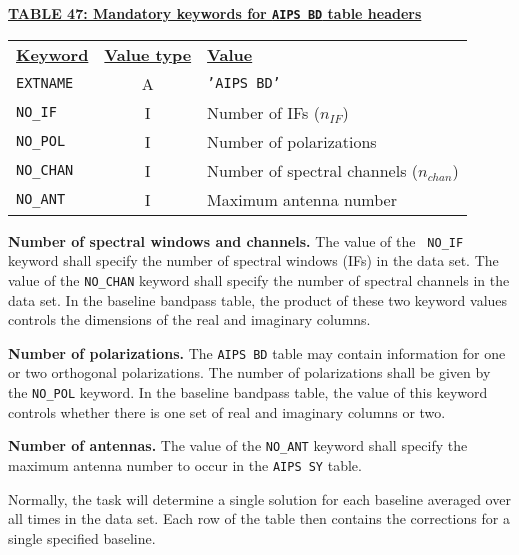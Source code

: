 \documentclass[twoside]{article}
\newcommand{\nif}{$n_{IF}$}
\newcommand{\nchan}{$n_{chan}$}
\begin{document}
\begin{center}
\underline{\bf{TABLE 47: Mandatory keywords for {\tt AIPS BD} table
    headers}}\\
\begin{tabular}{lcl}
\noalign{\vspace{2pt}} \label{ta:BDkeys}
\underline{{\bf Keyword}} & \underline{\bf{Value type}} &
    \underline{\bf{Value\vphantom{y}}} \\
\noalign{\vspace{2pt}}
{\tt EXTNAME}   & A & {\tt 'AIPS BD'}  \\
{\tt NO\_IF}    & I & Number of IFs (\nif)\\
{\tt NO\_POL}   & I & Number of polarizations \\
{\tt NO\_CHAN}  & I & Number of spectral channels (\nchan) \\
{\tt NO\_ANT}   & I & Maximum antenna number
\end{tabular}
\end{center}

{\bf Number of spectral windows and channels.} The value of the {\tt
  NO\_IF} keyword shall specify the number of spectral windows (IFs)
in the data set.  The value of the {\tt NO\_CHAN} keyword shall
specify the number of spectral channels in the data set.  In the
baseline bandpass table, the product of these two keyword values
controls the  dimensions of the real and imaginary columns.

{\bf Number of polarizations.}  The {\tt AIPS BD} table may contain
information for one or two orthogonal polarizations.  The number of
polarizations shall be given by the {\tt NO\_POL} keyword.   In the
baseline bandpass table, the value of this keyword controls whether
there is one set of real and imaginary columns or two.

{\bf Number of antennas.} The value of the {\tt NO\_ANT} keyword shall
specify the maximum antenna number to occur in the {\tt AIPS SY} table.

Normally, the task will determine a single solution for each baseline
averaged over all times in the data set.  Each row of the table then
contains the corrections for a single specified baseline.
\end{document}
